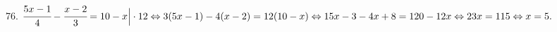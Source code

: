 76. $\cfrac{5x-1}{4}-\cfrac{x-2}{3}=10-x\Big|\cdot12\Leftrightarrow
3(5x-1)-4(x-2)=12(10-x)\Leftrightarrow15x-3-4x+8=120-12x\Leftrightarrow23x=115\Leftrightarrow x=5.$\\
